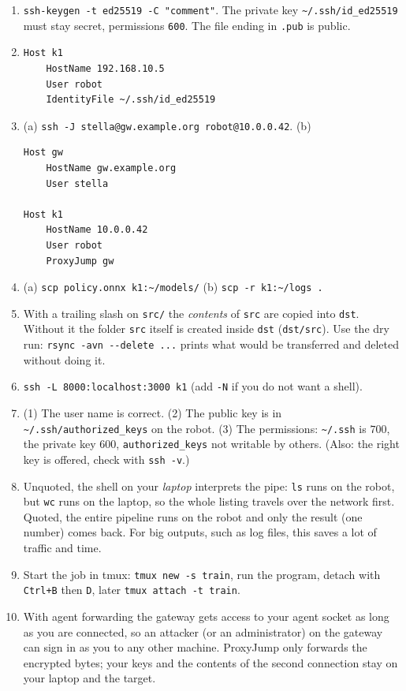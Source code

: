 \begin{enumerate}[label=\textbf{\ansnum.\arabic*}]
  \item \verb|ssh-keygen -t ed25519 -C "comment"|. The private key \texttt{\textasciitilde/.ssh/id\_ed25519} must stay secret, permissions \texttt{600}. The file ending in \texttt{.pub} is public.
  \item \begin{verbatim}
Host k1
    HostName 192.168.10.5
    User robot
    IdentityFile ~/.ssh/id_ed25519
\end{verbatim}
  \item (a) \verb|ssh -J stella@gw.example.org robot@10.0.0.42|. (b)
\begin{verbatim}
Host gw
    HostName gw.example.org
    User stella

Host k1
    HostName 10.0.0.42
    User robot
    ProxyJump gw
\end{verbatim}
  \item (a) \verb|scp policy.onnx k1:~/models/| (b) \verb|scp -r k1:~/logs .|
  \item With a trailing slash on \texttt{src/} the \emph{contents} of \texttt{src} are copied into \texttt{dst}. Without it the folder \texttt{src} itself is created inside \texttt{dst} (\texttt{dst/src}). Use the dry run: \verb|rsync -avn --delete ...| prints what would be transferred and deleted without doing it.
  \item \verb|ssh -L 8000:localhost:3000 k1| (add \texttt{-N} if you do not want a shell).
  \item (1) The user name is correct. (2) The public key is in \verb|~/.ssh/authorized_keys| on the robot. (3) The permissions: \texttt{\textasciitilde/.ssh} is $700$, the private key $600$, \texttt{authorized\_keys} not writable by others. (Also: the right key is offered, check with \verb|ssh -v|.)
  \item Unquoted, the shell on your \emph{laptop} interprets the pipe: \texttt{ls} runs on the robot, but \texttt{wc} runs on the laptop, so the whole listing travels over the network first. Quoted, the entire pipeline runs on the robot and only the result (one number) comes back. For big outputs, such as log files, this saves a lot of traffic and time.
  \item Start the job in tmux: \verb|tmux new -s train|, run the program, detach with \texttt{Ctrl+B} then \texttt{D}, later \verb|tmux attach -t train|.
  \item With agent forwarding the gateway gets access to your agent socket as long as you are connected, so an attacker (or an administrator) on the gateway can sign in as you to any other machine. ProxyJump only forwards the encrypted bytes; your keys and the contents of the second connection stay on your laptop and the target.
\end{enumerate}
